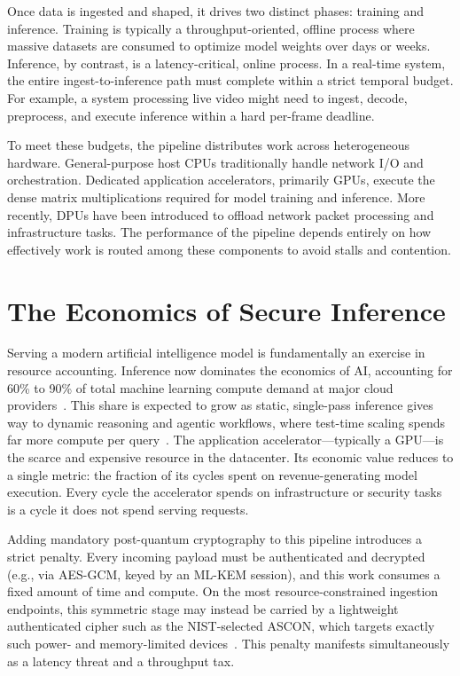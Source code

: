 Once data is ingested and shaped, it drives two distinct phases: training and inference. Training is typically a throughput-oriented, offline process where massive datasets are consumed to optimize model weights over days or weeks. Inference, by contrast, is a latency-critical, online process. In a real-time system, the entire ingest-to-inference path must complete within a strict temporal budget. For example, a system processing live video might need to ingest, decode, preprocess, and execute inference within a hard per-frame deadline.

To meet these budgets, the pipeline distributes work across heterogeneous hardware. General-purpose host CPUs traditionally handle network I/O and orchestration. Dedicated application accelerators, primarily GPUs, execute the dense matrix multiplications required for model training and inference. More recently, DPUs have been introduced to offload network packet processing and infrastructure tasks. The performance of the pipeline depends entirely on how effectively work is routed among these components to avoid stalls and contention.

\section{The Economics of Secure Inference}
\label{sec:end-to-end-economics}

Serving a modern artificial intelligence model is fundamentally an exercise in resource accounting. Inference now dominates the economics of AI, accounting for 60\% to 90\% of total machine learning compute demand at major cloud providers~\cite{luccioni2024power, xing2026ai}. This share is expected to grow as static, single-pass inference gives way to dynamic reasoning and agentic workflows, where test-time scaling spends far more compute per query~\cite{kim2026cost}. The application accelerator---typically a GPU---is the scarce and expensive resource in the datacenter. Its economic value reduces to a single metric: the fraction of its cycles spent on revenue-generating model execution. Every cycle the accelerator spends on infrastructure or security tasks is a cycle it does not spend serving requests.

Adding mandatory post-quantum cryptography to this pipeline introduces a strict penalty. Every incoming payload must be authenticated and decrypted (e.g., via AES-GCM, keyed by an ML-KEM session), and this work consumes a fixed amount of time and compute. On the most resource-constrained ingestion endpoints, this symmetric stage may instead be carried by a lightweight authenticated cipher such as the NIST-selected ASCON, which targets exactly such power- and memory-limited devices~\cite{cagua2025ascon}. This penalty manifests simultaneously as a latency threat and a throughput tax.

